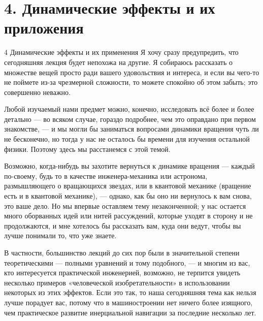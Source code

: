 \documentclass[10pt,oneside]{article}
\begin{document}
\clearpage
{}
\section*{4. Динамические эффекты и их приложения}
\label{tips-sec-12-4-динамические-эффекты-и-их-приложения}
4 Динамические эффекты и их применения Я хочу сразу предупредить, что сегодняшняя лекция будет непохожа на другие. Я собираюсь рассказать о множестве вещей просто ради вашего удовольствия и интереса, и если вы чего-то не поймете из-за чрезмерной сложности, то можете спокойно об этом забыть; это совершенно неважно.\par

Любой изучаемый нами предмет можно, конечно, исследовать всё более и более детально --- во всяком случае, гораздо подробнее, чем это оправдано при первом знакомстве, --- и мы могли бы заниматься вопросами динамики вращения чуть ли не бесконечно, но тогда у нас не осталось бы времени для изучения остальной физики. Поэтому здесь мы расстанемся с этой темой.\par

Возможно, когда-нибудь вы захотите вернуться к динамике вращения --- каждый по-своему, будь то в качестве инженера-механика или астронома, размышляющего о вращающихся звездах, или в квантовой механике (вращение есть и в квантовой механике), --- однако, как бы оно ни вернулось к вам снова, это ваше дело. Но мы впервые оставляем тему незаконченной; у нас остается много оборванных идей или нитей рассуждений, которые уходят в сторону и не продолжаются, и мне хотелось бы рассказать вам, куда они ведут, чтобы вы лучше понимали то, что уже знаете.\par

В частности, большинство лекций до сих пор были в значительной степени теоретическими --- полными уравнений и тому подобного, --- и многим из вас, кто интересуется практической инженерией, возможно, не терпится увидеть несколько примеров «человеческой изобретательности» в использовании некоторых из этих эффектов. Если это так, то наша сегодняшняя тема как нельзя лучше порадует вас, потому что в машиностроении нет ничего более изящного, чем практическое развитие инерциальной навигации за последние несколько лет.\par
\end{document}
